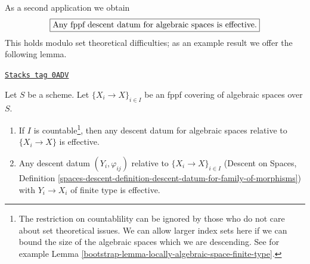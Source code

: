 As a second application we obtain
$$
\fbox{Any fppf descent datum for algebraic spaces is effective.}
$$
This holds modulo set theoretical difficulties; as an example result
we offer the following lemma.

\begin{lemma}
\label{bootstrap-lemma-descend-algebraic-space}
\href{https://stacks.math.columbia.edu/tag/0ADV}{\texttt{Stacks tag 0ADV}}


Let $S$ be a scheme. Let $\{X_i \to X\}_{i \in I}$ be an fppf
covering of algebraic spaces over $S$.
\begin{enumerate}
\item If $I$ is countable\footnote{The restriction on countablility can be
ignored by those who do not care about set theoretical issues. We can allow
larger index sets here if we can bound the size of the algebraic spaces
which we are descending. See for example
Lemma \ref{bootstrap-lemma-locally-algebraic-space-finite-type}.}, then any
descent datum for algebraic spaces relative to $\{X_i \to X\}$ is effective.
\item Any descent datum $(Y_i, \varphi_{ij})$ relative to
$\{X_i \to X\}_{i \in I}$ (Descent on Spaces, Definition
\ref{spaces-descent-definition-descent-datum-for-family-of-morphisms})
with $Y_i \to X_i$ of finite type
is effective.
\end{enumerate}
\end{lemma}

